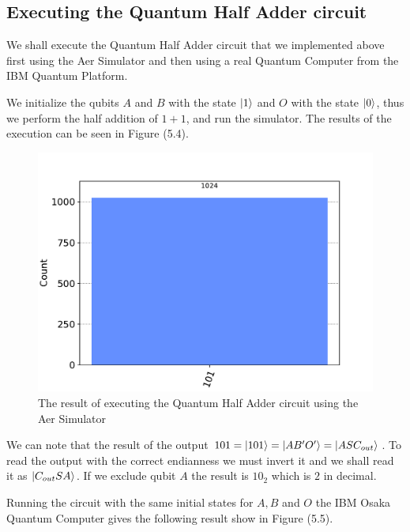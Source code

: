 \newpage

\subsection{Executing the Quantum Half Adder circuit}

We shall execute the Quantum Half Adder circuit that we implemented above first using the Aer Simulator
and then using a real Quantum Computer from the IBM Quantum Platform.

We initialize the qubits $A$ and $B$ with the state $\ket{1}$ and $O$ with the state $\ket{0}$, thus we
perform the half addition of $1+1$, and run the simulator. The results of the execution can be seen in
Figure (5.4).

\begin{figure}[!ht]
    \centering
    \includegraphics[scale=.5]{images/5_Implementation/half_adder_local_result.pdf}
    \caption{The result of executing the Quantum Half Adder circuit using the Aer Simulator}
\end{figure}

We can note that the result of the output $101=\ket{101}=\ket{AB'O'}=\ket{ASC_{out}}$. To read
the output with the correct endianness we must invert it and we shall read it as $\ket{C_{out}SA}$.
If we exclude qubit $A$ the result is $10_2$ which is $2$ in decimal.

Running the circuit with the same initial states for $A,B$ and $O$ the IBM Osaka Quantum Computer
gives the following result show in Figure (5.5).

